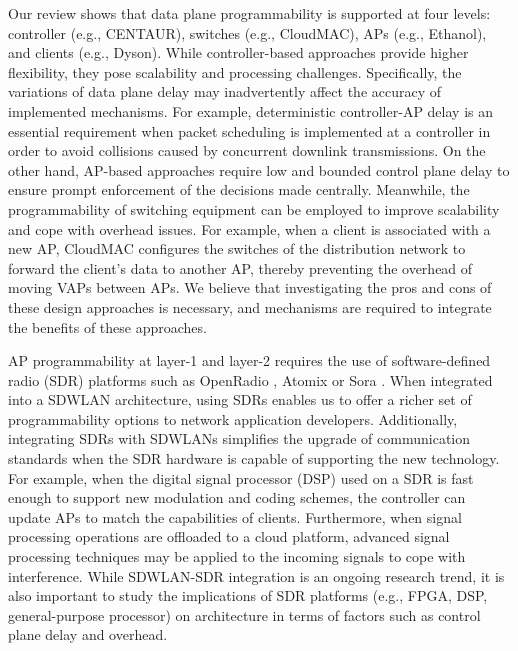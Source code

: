 Our review shows that data plane programmability is supported at four levels: controller (e.g., CENTAUR), switches (e.g., CloudMAC), APs (e.g., Ethanol), and clients (e.g., Dyson).
While controller-based approaches provide higher flexibility, they pose scalability and processing challenges.
Specifically, the variations of data plane delay may inadvertently affect the accuracy of implemented mechanisms. 
For example, deterministic controller-AP delay is an essential requirement when packet scheduling is implemented at a controller in order to avoid collisions caused by concurrent downlink transmissions.
On the other hand, AP-based approaches require low and bounded control plane delay to ensure prompt enforcement of the decisions made centrally.
Meanwhile, the programmability of switching equipment can be employed to improve scalability and cope with overhead issues.
For example, when a client is associated with a new AP, CloudMAC configures the switches of the distribution network to forward the client's data to another AP, thereby preventing the overhead of moving VAPs between APs.
We believe that investigating the pros and cons of these design approaches is necessary, and mechanisms are required to integrate the benefits of these approaches.


AP programmability at layer-1 and layer-2 requires the use of software-defined radio (SDR) platforms such as OpenRadio \cite{OpenRadio}, Atomix \cite{Atomix} or Sora \cite{Sora}.
When integrated into a SDWLAN architecture, using SDRs enables us to offer a richer set of programmability options to network application developers.
Additionally, integrating SDRs with SDWLANs simplifies the upgrade of communication standards when the SDR hardware is capable of supporting the new technology.
For example, when the digital signal processor (DSP) used on a SDR is fast enough to support new modulation and coding schemes, the controller can update APs to match the capabilities of clients.
Furthermore, when signal processing operations are offloaded to a cloud platform, advanced signal processing techniques may be applied to the incoming signals to cope with interference.
While SDWLAN-SDR integration is an ongoing research trend, it is also important to study the implications of SDR platforms (e.g., FPGA, DSP, general-purpose processor) on architecture in terms of factors such as control plane delay and overhead.



